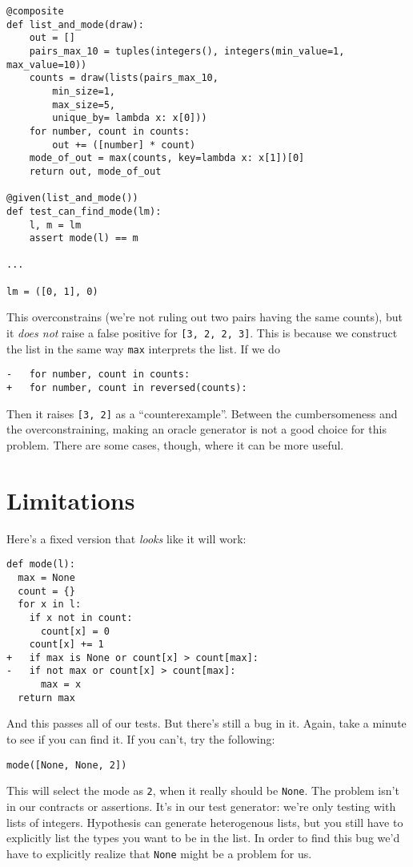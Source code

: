 \begin{verbatim}
@composite
def list_and_mode(draw):
    out = []
    pairs_max_10 = tuples(integers(), integers(min_value=1, max_value=10))
    counts = draw(lists(pairs_max_10, 
        min_size=1,
        max_size=5, 
        unique_by= lambda x: x[0]))
    for number, count in counts:
        out += ([number] * count)
    mode_of_out = max(counts, key=lambda x: x[1])[0]
    return out, mode_of_out

@given(list_and_mode())
def test_can_find_mode(lm):
    l, m = lm
    assert mode(l) == m

...

lm = ([0, 1], 0)
\end{verbatim}
This overconstrains (we're not ruling out two pairs having the same
counts), but it \emph{does not} raise a false positive for
\texttt{{[}3,\ 2,\ 2,\ 3{]}}. This is because we construct the list in
the same way \texttt{max} interprets the list. If we do

\begin{verbatim}
-   for number, count in counts:
+   for number, count in reversed(counts):
\end{verbatim}

Then it raises \texttt{{[}3,\ 2{]}} as a ``counterexample''. Between the
cumbersomeness and the overconstraining, making an oracle generator is
not a good choice for this problem. There are some cases, though, where
it can be more useful.

\section{Limitations}\label{limitations}

Here's a fixed version that \emph{looks} like it will work:

\begin{verbatim}
def mode(l):
  max = None
  count = {}
  for x in l:
    if x not in count:
      count[x] = 0
    count[x] += 1
+   if max is None or count[x] > count[max]:
-   if not max or count[x] > count[max]:
      max = x
  return max
\end{verbatim}
And this passes all of our tests. But there's still a bug in it. Again,
take a minute to see if you can find it. If you can't, try the
following:

\begin{verbatim}
mode([None, None, 2])
\end{verbatim}
This will select the mode as \texttt{2}, when it really should be
\texttt{None}. The problem isn't in our contracts or assertions. It's in
our test generator: we're only testing with lists of integers.
Hypothesis can generate heterogenous lists, but you still have to
explicitly list the types you want to be in the list. In order to find
this bug we'd have to explicitly realize that \texttt{None} might be a
problem for us.

